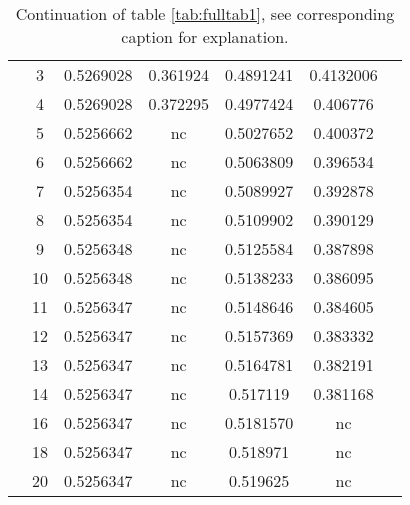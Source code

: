 \begin{table}[h!]
\begin{center}
\begin{tabular}{|c|c|c|c|c|c|c|}
& 3&0.5269028 &0.361924 & 0.4891241&0.4132006 & \\
& 4 &0.5269028 &0.372295 &0.4977424 &0.406776 & \\
& 5&0.5256662 &nc &0.5027652 &0.400372 & \\
& 6&0.5256662 &nc &0.5063809 &0.396534  & \\
& 7&0.5256354 & nc&0.5089927 &0.392878 & \\
& 8&0.5256354 &nc &0.5109902 &0.390129 & \\
& 9&0.5256348 &nc &0.5125584 &0.387898 & \\
& 10&0.5256348 &nc&0.5138233 &0.386095 & \\
& 11&0.5256347 &nc &0.5148646 &0.384605 & \\
& 12&0.5256347 &nc &0.5157369 &0.383332 & \\
& 13&0.5256347 &nc   &0.5164781 &0.382191 & \\
&14 &0.5256347 &nc &0.517119 &0.381168 & \\
&16 &0.5256347 &nc &0.5181570 & nc& \\
& 18&0.5256347 &nc &0.518971 &nc & \\
&20 &0.5256347 &nc &0.519625 &nc & \\
\hline
\end{tabular}
\end{center}
\caption{Continuation of table \ref{tab:fulltab1}, see corresponding caption for explanation.}
\label{tab:fulltab2}
\end{table}


